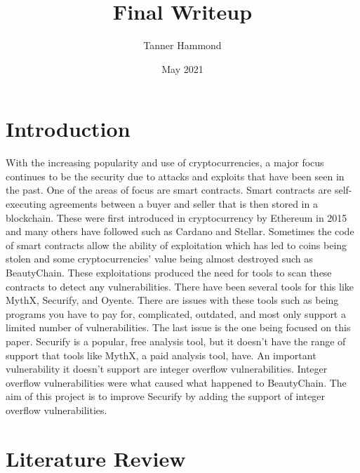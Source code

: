 \documentclass{article}
\title{Final Writeup}
\author{Tanner Hammond}
\date{May 2021}
\begin{document}
\maketitle

\section{Introduction}

With the increasing popularity and use of cryptocurrencies, a major focus continues to be the security due to attacks and exploits that have been seen in the past. One of the areas of focus are smart contracts. Smart contracts are self-executing agreements between a buyer and seller that is then stored in a blockchain. These were first introduced in cryptocurrency by Ethereum in 2015 and many others have followed such as Cardano and Stellar. Sometimes the code of smart contracts allow the ability of exploitation which has led to coins being stolen and some cryptocurrencies' value being almost destroyed such as BeautyChain. These exploitations produced the need for tools to scan these contracts to detect any vulnerabilities. There have been several tools for this like MythX, Securify, and Oyente. There are issues with these tools such as being programs you have to pay for, complicated, outdated, and most only support a limited number of vulnerabilities. The last issue is the one being focused on this paper. Securify is a popular, free analysis tool, but it doesn't have the range of support that tools like MythX, a paid analysis tool, have. An important vulnerability it doesn't support are integer overflow vulnerabilities. Integer overflow vulnerabilities were what caused what happened to BeautyChain. The aim of this project is to improve Securify by adding the support of integer overflow vulnerabilities. 

\section{Literature Review}
\end{document}
